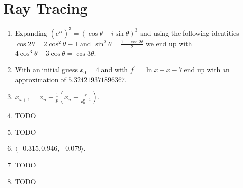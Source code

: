\documentclass[a4paper]{report}
\begin{document}
\chapter{Ray Tracing}
\begin{enumerate}
	\item Expanding $\left(e^{i\theta}\right)^3=(\cos\theta + i\sin\theta)^3$ and using the following identities
		$\cos2\theta = 2\cos^2\theta-1$ and $\sin^2\theta=\frac{1 - \cos2\theta}{2}$ we end up with
		$4\cos^3\theta - 3\cos\theta=\cos3\theta$.
	\item With an initial guess $x_0 = 4$ and with $f^{\prime}=\ln x + x - 7$ end up with an approximation of
		$5.324219371896367$.
	\item $x_{n+1} = x_n - \frac{1}{p}(x_n - \frac{r}{x_n^{p-1}})$.
	\item TODO
	\item TODO
	\item $\langle -0.315, 0.946, -0.079 \rangle$.
	\item TODO
	\item TODO
\end{enumerate}
\end{document}
